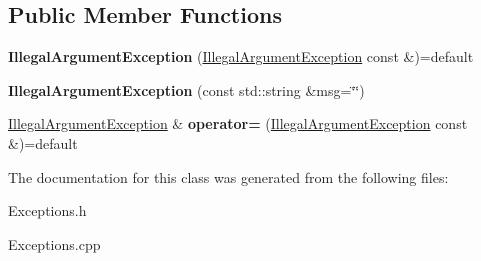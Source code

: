 \subsection*{Public Member Functions}
\begin{DoxyCompactItemize}
\item 
\mbox{\label{classantlr4_1_1IllegalArgumentException_acda3074f89b070654ff37fe085e5d3c4}} 
{\bfseries Illegal\+Argument\+Exception} (\hyperlink{classantlr4_1_1IllegalArgumentException}{Illegal\+Argument\+Exception} const \&)=default
\item 
\mbox{\label{classantlr4_1_1IllegalArgumentException_ae6ec26e5909ca7e8ad18a24be518bf91}} 
{\bfseries Illegal\+Argument\+Exception} (const std\+::string \&msg=\char`\"{}\char`\"{})
\item 
\mbox{\label{classantlr4_1_1IllegalArgumentException_aad0904b007ddc615717459fc37fc430b}} 
\hyperlink{classantlr4_1_1IllegalArgumentException}{Illegal\+Argument\+Exception} \& {\bfseries operator=} (\hyperlink{classantlr4_1_1IllegalArgumentException}{Illegal\+Argument\+Exception} const \&)=default
\end{DoxyCompactItemize}


The documentation for this class was generated from the following files\+:\begin{DoxyCompactItemize}
\item 
Exceptions.\+h\item 
Exceptions.\+cpp\end{DoxyCompactItemize}
